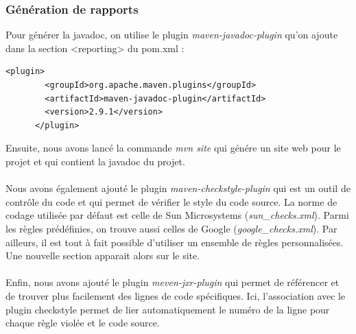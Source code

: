 \documentclass{article}
\begin{document}
\subsubsection{Génération de rapports}
Pour générer la javadoc, on utilise le plugin \textit{maven-javadoc-plugin} qu'on ajoute dans la section <reporting> du pom.xml : 
\begin{verbatim}
<plugin>
        <groupId>org.apache.maven.plugins</groupId>
        <artifactId>maven-javadoc-plugin</artifactId>
        <version>2.9.1</version>
      </plugin>
\end{verbatim}
Ensuite, nous avons lancé la commande \textit{mvn site} qui génére un site web pour le projet et qui contient la javadoc du projet. \\\\
Nous avons également ajouté le plugin \textit{maven-checkstyle-plugin} qui est un outil de contrôle du code et qui permet de vérifier le style du code source. La norme de codage utilisée par défaut est celle de Sun Microsystems (\textit{sun\_checks.xml}). Parmi les règles prédéfinies, on trouve aussi celles de Google (\textit{google\_checks.xml}). Par ailleurs, il est tout à fait possible d'utiliser un ensemble de règles personnalisées. Une nouvelle section apparait alors sur le site. \\\\
Enfin, nous avons ajouté le plugin \textit{meven-jxr-plugin} qui permet de référencer et de trouver plus facilement des lignes de code spécifiques.	Ici, l'association avec le plugin checkstyle permet de lier automatiquement le numéro de la ligne pour chaque règle violée et le code source.
\end{document}
